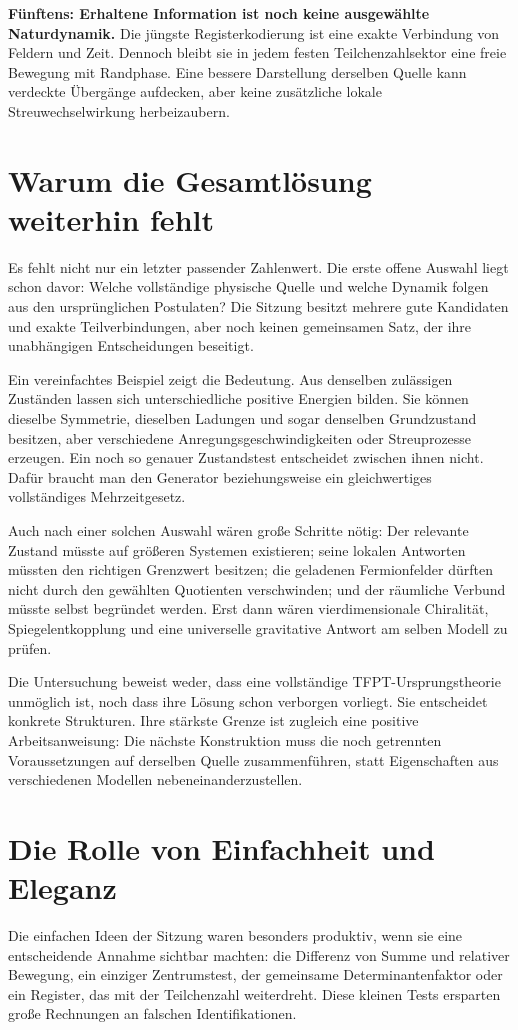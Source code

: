 \textbf{Fünftens: Erhaltene Information ist noch keine ausgewählte Naturdynamik.} Die jüngste Registerkodierung ist eine exakte Verbindung von Feldern und Zeit. Dennoch bleibt sie in jedem festen Teilchenzahlsektor eine freie Bewegung mit Randphase. Eine bessere Darstellung derselben Quelle kann verdeckte Übergänge aufdecken, aber keine zusätzliche lokale Streuwechselwirkung herbeizaubern. 

\section{Warum die Gesamtlösung weiterhin fehlt}
Es fehlt nicht nur ein letzter passender Zahlenwert. Die erste offene Auswahl liegt schon davor: Welche vollständige physische Quelle und welche Dynamik folgen aus den ursprünglichen Postulaten? Die Sitzung besitzt mehrere gute Kandidaten und exakte Teilverbindungen, aber noch keinen gemeinsamen Satz, der ihre unabhängigen Entscheidungen beseitigt.

Ein vereinfachtes Beispiel zeigt die Bedeutung. Aus denselben zulässigen Zuständen lassen sich unterschiedliche positive Energien bilden. Sie können dieselbe Symmetrie, dieselben Ladungen und sogar denselben Grundzustand besitzen, aber verschiedene Anregungsgeschwindigkeiten oder Streuprozesse erzeugen. Ein noch so genauer Zustandstest entscheidet zwischen ihnen nicht. Dafür braucht man den Generator beziehungsweise ein gleichwertiges vollständiges Mehrzeitgesetz. 

Auch nach einer solchen Auswahl wären große Schritte nötig: Der relevante Zustand müsste auf größeren Systemen existieren; seine lokalen Antworten müssten den richtigen Grenzwert besitzen; die geladenen Fermionfelder dürften nicht durch den gewählten Quotienten verschwinden; und der räumliche Verbund müsste selbst begründet werden. Erst dann wären vierdimensionale Chiralität, Spiegelentkopplung und eine universelle gravitative Antwort am selben Modell zu prüfen.

Die Untersuchung beweist weder, dass eine vollständige TFPT-Ursprungstheorie unmöglich ist, noch dass ihre Lösung schon verborgen vorliegt. Sie entscheidet konkrete Strukturen. Ihre stärkste Grenze ist zugleich eine positive Arbeitsanweisung: Die nächste Konstruktion muss die noch getrennten Voraussetzungen auf derselben Quelle zusammenführen, statt Eigenschaften aus verschiedenen Modellen nebeneinanderzustellen.

\section{Die Rolle von Einfachheit und Eleganz}
Die einfachen Ideen der Sitzung waren besonders produktiv, wenn sie eine entscheidende Annahme sichtbar machten: die Differenz von Summe und relativer Bewegung, ein einziger Zentrumstest, der gemeinsame Determinantenfaktor oder ein Register, das mit der Teilchenzahl weiterdreht. Diese kleinen Tests ersparten große Rechnungen an falschen Identifikationen.

